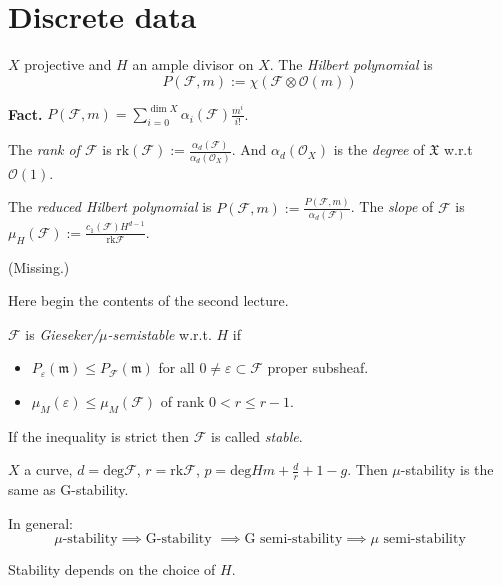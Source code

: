 \section{Discrete data}
\label{section-discrete-data}

$X$ projective and $H$ an ample divisor on
$X$. The {\it Hilbert polynomial} is
$$
P(\mathcal{F},m):=\chi(\mathcal{F}\otimes
\mathcal{O}(m))
$$

\medskip\noindent
{\bf Fact.}
$P(\mathcal{F},m)=\sum_{i=0}^{\dim
X}\alpha_i(\mathcal{F})\frac{m^i}{i!}$.

The {\it rank of $\mathcal{F}$} is
$\text{rk}(\mathcal{F}):=
\frac{\alpha_d(\mathcal{F})
}{\alpha_d(\mathcal{O}_X)}$.
And $\alpha_d(\mathcal{O}_X)$ is the {\it
degree} of $\mathfrak{X}$ w.r.t
$\mathcal{O}(1)$.

The {\it reduced Hilbert polynomial} is
$P(\mathcal{F},m):=\frac{P(\mathcal{F},m)
}{\alpha_d(\mathcal{F})}$.
The {\it slope} of $\mathcal{F}$ is
$\mu_H(\mathcal{F}):=\frac{c_1(\mathcal{F})
H^{d-1}}{\text{rk}\mathcal{F}}$.

\begin{example}
\label{msos-label-003}
(Missing.)
\end{example}

\medskip\noindent
Here begin the contents of the second
lecture.
\begin{definition}
\label{definition-Gieseker-and-mu-stability}
$\mathcal{F}$ is {\it
Gieseker/$\mu$-semistable} w.r.t. $H$ if
\begin{itemize}
\item $P_\varepsilon(\mathfrak{m})\leq
P_{\mathcal{F}}(\mathfrak{m})$ for all $0
\neq  \varepsilon \subset \mathcal{F}$ proper
subsheaf.
\item $\mu_{M}(\varepsilon) \leq
\mu_{M}(\mathcal{F})$ of rank $0<r \leq r-1$.
\end{itemize}
If the inequality is strict then
$\mathcal{F}$ is called {\it stable}.
\end{definition}

\begin{example}
\label{msos-label-004}
$X$ a curve, $d=\text{deg}\mathcal{F}$,
$r=\text{rk}\mathcal{F}$,
$p=\text{deg}Hm+\frac{d}{r}+1-g$. Then
$\mu$-stability is the same as G-stability.
\end{example}
In general:
$$
\mu\text{-stability}\implies \text{
G-stability }\implies \text{G semi-stability
}\implies \mu \text{ semi-stability}
$$
\begin{remark}
\label{remark-stability-depends-on-H}
Stability depends on the choice of $H$.
\end{remark}

